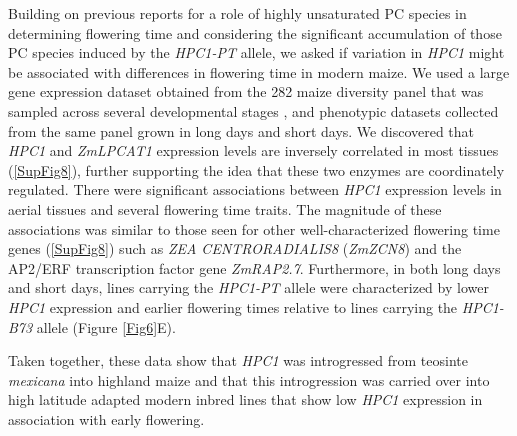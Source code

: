 \documentclass[9pt,twocolumn,twoside,lineno]{biorxiv}
\begin{document}
Building on previous reports for a role of highly unsaturated PC species in determining flowering time \cite{Nakamura2014-qf, Riedelsheimer2013-bd} and considering the significant accumulation of those PC species induced by the \textit{HPC1-PT} allele, we asked if variation in \textit{HPC1} might be associated with differences in flowering time in modern maize. 
We used a large gene expression dataset obtained from the 282 maize diversity panel that was sampled across several developmental stages \cite{Kremling2018-gn}, and phenotypic datasets collected from the same panel grown in long days and short days.
We discovered that \textit{HPC1} and \textit{ZmLPCAT1} expression levels are inversely correlated in most tissues (\ref{SupFig8}), further supporting the idea that these two enzymes are coordinately regulated. 
There were significant associations between \textit{HPC1} expression levels in aerial tissues and several flowering time traits.
The magnitude of these associations was similar to those seen for other well-characterized flowering time genes (\ref{SupFig8}) such as \textit{ZEA CENTRORADIALIS8} (\textit{ZmZCN8})  and the AP2/ERF transcription factor gene \textit{ZmRAP2.7}.  
Furthermore, in both long days and short days, lines carrying the \textit{HPC1-PT} allele were characterized by lower \textit{HPC1} expression and earlier flowering times relative to lines carrying the \textit{HPC1-B73} allele (Figure \ref{Fig6}E). 

Taken together, these data show that \textit{HPC1} was introgressed from teosinte \textit{mexicana} into highland maize and that this introgression was carried over into high latitude adapted modern inbred lines that show low \textit{HPC1} expression in association with early flowering.
\end{document}
